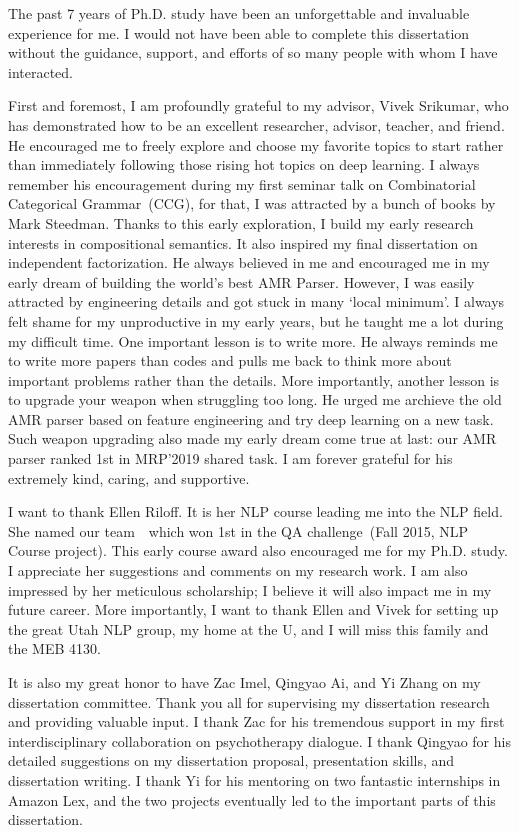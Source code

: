 The past 7 years of Ph.D. study have been an unforgettable and
invaluable experience for me. I would not have been able to complete
this dissertation without the guidance, support, and efforts of so
many people with whom I have interacted.

First and foremost, I am profoundly grateful to my advisor, Vivek
Srikumar, who has demonstrated how to be an excellent
researcher, advisor, teacher, and friend. He encouraged me to freely
explore and choose my favorite topics to start rather than immediately
following those rising hot topics on deep learning. I always remember
his encouragement during my first seminar talk on Combinatorial
Categorical Grammar~(CCG), for that, I was attracted by a bunch of
books by Mark Steedman. Thanks to this early exploration, I build my
early research interests in compositional semantics. It also
inspired my final dissertation on independent factorization. He always
believed in me and encouraged me in my early dream of building the world's
best AMR Parser. However, I was easily attracted by engineering
details and got stuck in many `local minimum'. I always felt shame
for my unproductive in my early years, but he taught me a lot during my
difficult time. One important lesson is to write more. He always
reminds me to write more papers than codes and pulls me back to think
more about important problems rather than the details. More importantly,
another lesson is to upgrade your weapon when struggling too long. He
urged me archieve the old AMR parser based on feature engineering and
try deep learning on a new task. Such weapon upgrading also made my
early dream come true at last: our AMR parser ranked 1st in MRP'2019
shared task. I am forever grateful for his extremely kind, caring, and
supportive.

I want to thank Ellen Riloff. It is her NLP course leading me into the
NLP field. She named our team~~which won 1st
in the QA challenge~(Fall 2015, NLP Course project). This early course
award also encouraged me for my Ph.D. study. I appreciate her
suggestions and comments on my research work. I am also impressed by
her meticulous scholarship; I believe it will also impact me in my
future career. More importantly, I want to thank Ellen and Vivek for
setting up the great Utah NLP group, my home at the U, and I will miss
this family and the MEB 4130.

It is also my great honor to have Zac Imel, Qingyao Ai, and Yi Zhang on
my dissertation committee. Thank you all for supervising my dissertation
research and providing valuable input. I thank Zac for his tremendous
support in my first interdisciplinary collaboration on psychotherapy
dialogue. I thank Qingyao for his detailed suggestions on my dissertation
proposal, presentation skills, and dissertation writing. I thank Yi for his
mentoring on two fantastic internships in Amazon Lex, and the two
projects eventually led to the important parts of this dissertation.

